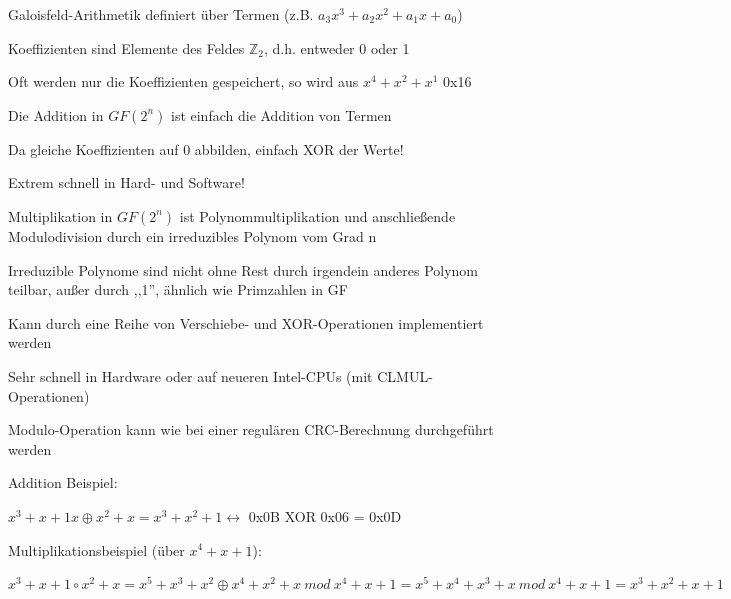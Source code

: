 \documentclass[a4paper]{article}
\begin{document}
\begin{multicols}{3}
      \begin{itemize*}
            \item Galoisfeld-Arithmetik definiert über Termen (z.B. $a_3x^3+a_2x^2+a_1x+a_0$)
            \item Koeffizienten sind Elemente des Feldes $\mathbb{Z}_2$, d.h. entweder 0 oder 1
            \item Oft werden nur die Koeffizienten gespeichert, so wird aus $x^4+x^2 +x^1$ 0x16
            \item Die Addition in $GF(2^n)$ ist einfach die Addition von Termen
            \begin{itemize*}
                  \item Da gleiche Koeffizienten auf 0 abbilden, einfach XOR der Werte!
                  \item Extrem schnell in Hard- und Software!
            \end{itemize*}
            \item Multiplikation in $GF(2^n)$ ist Polynommultiplikation und
            anschließende Modulodivision durch ein irreduzibles Polynom vom Grad n
            \begin{itemize*}
                  \item Irreduzible Polynome sind nicht ohne Rest durch irgendein anderes Polynom teilbar, außer durch ,,1'', ähnlich wie Primzahlen in GF
                  \item Kann durch eine Reihe von Verschiebe- und XOR-Operationen implementiert werden
                  \item Sehr schnell in Hardware oder auf neueren Intel-CPUs (mit CLMUL-Operationen)
                  \item Modulo-Operation kann wie bei einer regulären CRC-Berechnung durchgeführt werden
            \end{itemize*}
            \item Addition Beispiel:
            \begin{itemize*}
                  \item $x^3 +x+1 x\oplus x^2+x = x^3 +x^2 +1 \leftrightarrow$ 0x0B XOR 0x06 = 0x0D
            \end{itemize*}
            \item Multiplikationsbeispiel (über $x^4 +x+1$):
            \begin{itemize*}
                  \item $x^3 +x+1\circ x^2+x = x^5+x^3+x^2\oplus x^4+x^2+x\ mod\ x^4+x+1=x^5+x^4+x^3+x\ mod\ x^4+x+1 = x^3 +x^2 +x+1$

\end{itemize*}
\end{itemize*}
\end{multicols}
\end{document}
